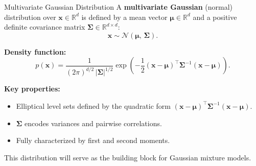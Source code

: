 \documentclass[serif, aspectratio=169]{beamer}
\begin{document}
\begin{frame}{Multivariate Gaussian Distribution}
A \textbf{multivariate Gaussian} (normal) distribution over 
$\mathbf{x}\in\mathbb{R}^d$ is defined by a mean vector 
$\boldsymbol{\mu}\in\mathbb{R}^d$ and a positive definite 
covariance matrix $\boldsymbol{\Sigma}\in\mathbb{R}^{d\times d}$:
\[
\mathbf{x} \sim \mathcal{N}(\boldsymbol{\mu},\,\boldsymbol{\Sigma}).
\]

\bigskip

\textbf{Density function:}
\[
p(\mathbf{x}) 
=
\frac{1}{(2\pi)^{d/2}\,|\boldsymbol{\Sigma}|^{1/2}}
\exp\!\left(
-\frac{1}{2}
(\mathbf{x}-\boldsymbol{\mu})^\top 
\boldsymbol{\Sigma}^{-1}
(\mathbf{x}-\boldsymbol{\mu})
\right).
\]

\bigskip

\textbf{Key properties:}
\begin{itemize}
    \item Elliptical level sets defined by the quadratic form  
    $(\mathbf{x}-\boldsymbol{\mu})^\top\boldsymbol{\Sigma}^{-1}(\mathbf{x}-\boldsymbol{\mu})$.
    \item $\boldsymbol{\Sigma}$ encodes variances and pairwise correlations.
    \item Fully characterized by first and second moments.
\end{itemize}

\bigskip
This distribution will serve as the building block for Gaussian mixture models.
\end{frame}
\end{document}
